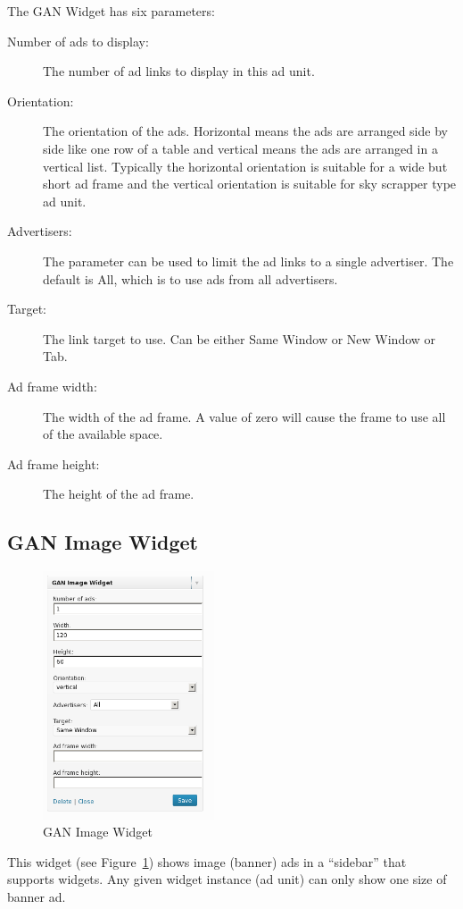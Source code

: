 \documentclass[letterpaper]{article}
\begin{document}
The GAN Widget has six parameters:
\begin{description}
  \item[Number of ads to display:] The number of ad links to display in
this ad unit.
  \item[Orientation:] The orientation of the ads. Horizontal
means the ads are arranged side by side like one row of a table and
vertical means the ads are arranged in a vertical list. Typically the
horizontal orientation is suitable for a wide but short ad frame and the
vertical orientation is suitable for sky scrapper type ad unit.
  \item[Advertisers:] The parameter can be used to limit the ad links to
a single advertiser.  The default is All, which is to use ads from all
advertisers.
  \item[Target:] The link target to use. Can be either Same 
Window or New Window or Tab.
  \item[Ad frame width:] The width of the ad frame. A value
of zero will cause the frame to use all of the available space.
  \item[Ad frame height:] The height of the ad frame.
\end{description}

\subsection{GAN Image Widget}

\begin{figure}[ht]
\begin{centering}
\includegraphics[width=2in]{ganimagewidget.png}
\caption{GAN Image Widget}
\label{fig:ganimagewidget}
\end{centering}
\end{figure}
This widget (see Figure~\ref{fig:ganimagewidget}) shows image (banner) 
ads in a ``sidebar'' that supports widgets.  Any given widget instance
(ad unit) can only show one size of banner ad.
\end{document}
